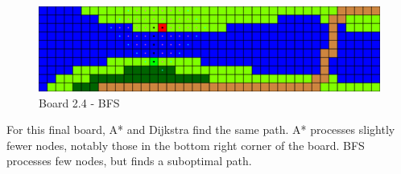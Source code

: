 \begin{figure}[h!]
  \centering
    \includegraphics[width=\textwidth]{img/board-2-4-bfs}
    \caption{Board 2.4 - BFS}
\end{figure}

For this final board, A* and Dijkstra find the same path. A* processes slightly
fewer nodes, notably those in the bottom right corner of the board.
BFS processes few nodes, but finds a suboptimal path.
